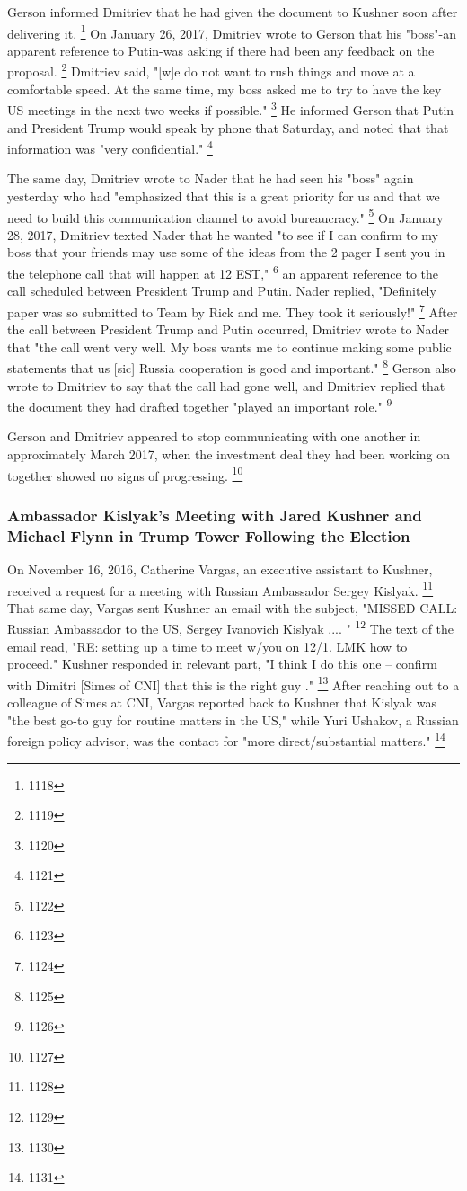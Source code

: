 Gerson informed Dmitriev that he had given the document to Kushner soon after delivering it.%
\footnote{1118}
On January 26, 2017, Dmitriev wrote to Gerson that his "boss"-an apparent reference to Putin-was asking if there had been any feedback on the proposal.%
\footnote{1119}
Dmitriev said, "[w]e do not want to rush things and move at a comfortable speed.
At the same time, my boss asked me to try to have the key US meetings in the next two weeks if possible."%
\footnote{1120}
He informed Gerson that Putin and President Trump would speak by phone that Saturday, and noted that that information was "very confidential."%
\footnote{1121}

The same day, Dmitriev wrote to Nader that he had seen his "boss" again yesterday who had "emphasized that this is a great priority for us and that we need to build this communication channel to avoid bureaucracy."%
\footnote{1122}
On January 28, 2017, Dmitriev texted Nader that he wanted "to see if I can confirm to my boss that your friends may use some of the ideas from the 2 pager I sent you in the telephone call that will happen at 12 EST,"%
\footnote{1123}
an apparent reference to the call scheduled between President Trump and Putin.
Nader replied, "Definitely paper was so submitted to Team by Rick and me.
They took it seriously!"%
\footnote{1124}
After the call between President Trump and Putin occurred, Dmitriev wrote to Nader that "the call went very well.
My boss wants me to continue making some public statements that us [sic] Russia cooperation is good and important."%
\footnote{1125}
Gerson also wrote to Dmitriev to say that the call had gone well, and Dmitriev replied that the document they had drafted together "played an important role."%
\footnote{1126}

Gerson and Dmitriev appeared to stop communicating with one another in approximately March 2017, when the investment deal they had been working on together showed no signs of progressing.%
\footnote{1127}

\subsubsection{Ambassador Kislyak's Meeting with Jared Kushner and Michael Flynn in Trump Tower Following the Election}

On November 16, 2016, Catherine Vargas, an executive assistant to Kushner, received a request for a meeting with Russian Ambassador Sergey Kislyak.%
\footnote{1128}
That same day, Vargas sent Kushner an email with the subject, "MISSED CALL: Russian Ambassador to the US, Sergey Ivanovich Kislyak .... "%
\footnote{1129}
The text of the email read, "RE: setting up a time to meet w/you on 12/1. LMK how to proceed."
Kushner responded in relevant part, "I think I do this one -- confirm with Dimitri [Simes of CNI] that this is the right guy ."%
\footnote{1130}
After reaching out to a colleague of Simes at CNI, Vargas reported back to Kushner that Kislyak was "the best go-to guy for routine matters in the US," while Yuri Ushakov, a Russian foreign policy advisor, was the contact for "more direct/substantial matters."%
\footnote{1131}

